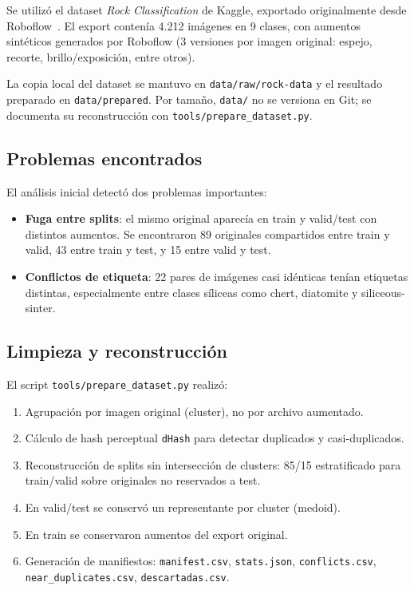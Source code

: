 Se utilizó el dataset \emph{Rock Classification} de Kaggle, exportado originalmente
desde Roboflow~\cite{rockdataset}. El export contenía 4.212 imágenes en 9 clases,
con aumentos sintéticos generados por Roboflow (3 versiones por imagen original:
espejo, recorte, brillo/exposición, entre otros).

La copia local del dataset se mantuvo en \texttt{data/raw/rock-data} y el resultado
preparado en \texttt{data/prepared}. Por tamaño, \texttt{data/} no se versiona en
Git; se documenta su reconstrucción con \texttt{tools/prepare\_dataset.py}.

\subsection{Problemas encontrados}

El análisis inicial detectó dos problemas importantes:

\begin{itemize}
  \item \textbf{Fuga entre splits}: el mismo original aparecía en train y valid/test
        con distintos aumentos. Se encontraron 89 originales compartidos entre train
        y valid, 43 entre train y test, y 15 entre valid y test.
  \item \textbf{Conflictos de etiqueta}: 22 pares de imágenes casi idénticas tenían
        etiquetas distintas, especialmente entre clases síliceas como chert,
        diatomite y siliceous-sinter.
\end{itemize}

\subsection{Limpieza y reconstrucción}

El script \texttt{tools/prepare\_dataset.py} realizó:

\begin{enumerate}
  \item Agrupación por imagen original (cluster), no por archivo aumentado.
  \item Cálculo de hash perceptual \texttt{dHash} para detectar duplicados y
        casi-duplicados.
  \item Reconstrucción de splits sin intersección de clusters: 85/15 estratificado
        para train/valid sobre originales no reservados a test.
  \item En valid/test se conservó un representante por cluster (medoid).
  \item En train se conservaron aumentos del export original.
  \item Generación de manifiestos: \texttt{manifest.csv}, \texttt{stats.json},
        \texttt{conflicts.csv}, \texttt{near\_duplicates.csv}, \texttt{descartadas.csv}.
\end{enumerate}

